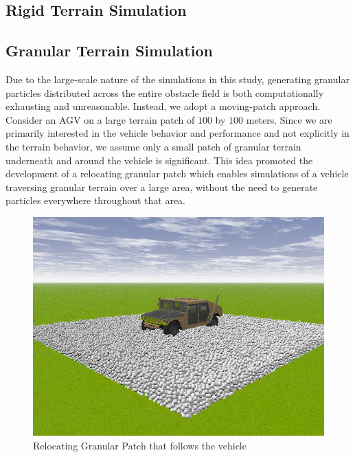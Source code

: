 \documentclass[12pt,onecolumn]{article}
\begin{document}

\subsection{Rigid Terrain Simulation}\label{RigidSim}


\subsection{Granular Terrain Simulation}\label{GranSim}

Due to the large-scale nature of the simulations in this study, generating granular particles distributed across the entire obstacle field is both computationally exhausting and unreasonable. Instead, we adopt a moving-patch approach. Consider an AGV on a large terrain patch of $100$ by $100$ meters. Since we are primarily interested in the vehicle behavior and performance and not explicitly in the terrain behavior, we assume only a small patch of granular terrain underneath and around the vehicle is significant. This idea promoted the development of a relocating granular patch which enables simulations of a vehicle traversing granular terrain over a large area, without the need to generate particles everywhere throughout that area. 

\begin{figure}
	\centering
	\includegraphics[width=0.8\columnwidth]{Figs/granPatch.png}
	\caption{\small Relocating Granular Patch that follows the vehicle}  
	\label{fig:granPatch}
\end{figure}
\end{document}
